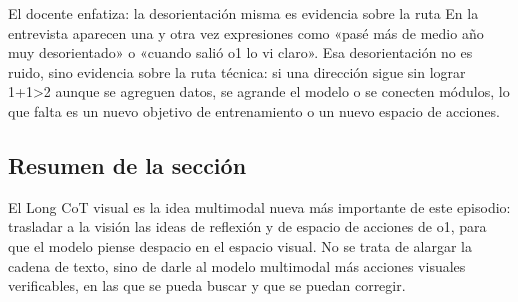 \begin{importantbox}{El docente enfatiza: la desorientación misma es evidencia sobre la ruta}
En la entrevista aparecen una y otra vez expresiones como «pasé más de medio año muy desorientado» o «cuando salió o1 lo vi claro». Esa desorientación no es ruido, sino evidencia sobre la ruta técnica: si una dirección sigue sin lograr 1+1>2 aunque se agreguen datos, se agrande el modelo o se conecten módulos, lo que falta es un nuevo objetivo de entrenamiento o un nuevo espacio de acciones.
\end{importantbox}

\subsection{Resumen de la sección}

El Long CoT visual es la idea multimodal nueva más importante de este episodio: trasladar a la visión las ideas de reflexión y de espacio de acciones de o1, para que el modelo piense despacio en el espacio visual. No se trata de alargar la cadena de texto, sino de darle al modelo multimodal más acciones visuales verificables, en las que se pueda buscar y que se puedan corregir.
